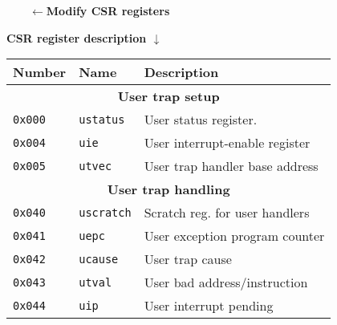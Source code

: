 \begin{multicols}{2}
\columnbreak

\textbf{$\qquad\leftarrow$Modify CSR registers}\\
\begin{flushright}
\textbf{CSR register description $\downarrow$}
    
    \begin{tabular}{|l|l|l|}
        \hline
        \textbf{Number}& \textbf{Name}     & \textbf{Description}                    \\
        \hline
        \multicolumn{3}{|c|}{\textbf{User trap setup}}                                        \\
        \hline
        \texttt{0x000} & \texttt{ustatus}  & User status register.                   \\
        \texttt{0x004} & \texttt{uie}      & User interrupt-enable register          \\
        \texttt{0x005} & \texttt{utvec}    & User trap handler base address          \\
        \hline
        \multicolumn{3}{|c|}{\textbf{User trap handling}}                            \\
        \hline
        \texttt{0x040} & \texttt{uscratch} & Scratch reg. for user handlers         \\
        \texttt{0x041} & \texttt{uepc}     & User exception program counter          \\
        \texttt{0x042} & \texttt{ucause}   & User trap cause                         \\
        \texttt{0x043} & \texttt{utval}    & User bad address/instruction         \\
        \texttt{0x044} & \texttt{uip}      & User interrupt pending                  \\
        \hline
    \end{tabular}
\end{flushright}
\end{multicols}
